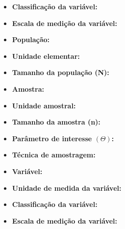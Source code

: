 \begin{enumerate}
\begin{itemize}
		\item \textbf{Classificação da variável:}~
		
		\item \textbf{Escala de medição da variável:}~
	\end{itemize}

	\subitem 

	\begin{itemize}	
		\item \textbf{População:}~
		
		\item \textbf{Unidade elementar:}~
		
		\item \textbf{Tamanho da população (N):}~
		
		\item \textbf{Amostra:}~
		
		\item \textbf{Unidade amostral:}~
		
		\item \textbf{Tamanho da amostra (n):}~
		
		\item \textbf{Parâmetro de interesse $\left(\varTheta\right)$:}~
		
		\item \textbf{Técnica de amostragem:}~
		
		\item \textbf{Variável:}~
		
		\item \textbf{Unidade de medida da variável:}~
		
		\item \textbf{Classificação da variável:}~
		
		\item \textbf{Escala de medição da variável:}~
	\end{itemize}
	
\end{enumerate}



